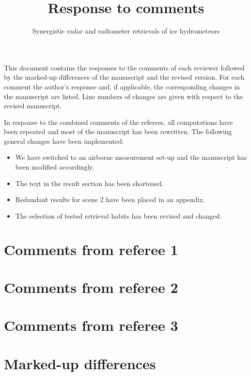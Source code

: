 \documentclass[11pt]{scrreprt}
\title{Response to comments}
\subtitle{Synergistic radar and radiometer retrievals of ice hydrometeors}
\date{}
\begin{document}
\maketitle

\setlength{\parindent}{0cm}

This document contains the responses to the comments of each reviewer followed
by the marked-up differences of the manuscript and the revised version. For each
comment the author's response and, if applicable, the corresponding changes in
the manuscript are listed. Line numbers of changes are given with respect to the
revised manuscript.

In response to the combined comments of the referees, all computations
have been repeated and most of the manuscript has been rewritten. The
following general changes have been implemented:

\begin{itemize}
\item We have switched to an airborne measurement set-up and
   the manuscript has been modified accordingly.
\item The text in the result section has been shortened.
\item Redundant results for scene 2 have been placed in an appendix.
\item The selection of tested retrieval habits has been revised and changed.
\end{itemize}

\chapter{Comments from referee 1}

\chapter{Comments from referee 2}

\chapter{Comments from referee 3}

\chapter{Marked-up differences}



\end{document}
